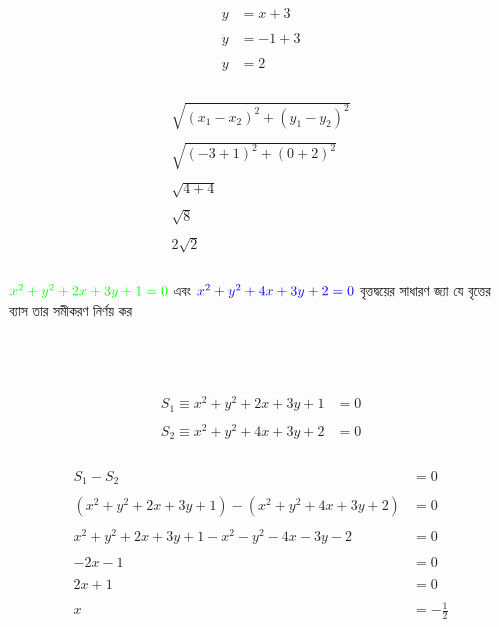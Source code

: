 \documentclass{article}
\begin{document}
\\
\begin{align*}
	y&=x+3\\
	\\
	y&=-1+3\\
	\\
	y&=2\\
\end{align*}
\\
\begin{align*}
	\sqrt{(x_1-x_2)^2+(y_1-y_2)^2}\\
	\\
	\sqrt{(-3+1)^2+(0+2)^2}\\
	\\
	\sqrt{4+4}\\
	\\
	\sqrt{8}\\
	\\
	2\sqrt{2}\\
\end{align*}
\\
$\textcolor{green}{x^2+y^2+2x+3y+1=0}$ এবং $\textcolor{blue}{x^2+y^2+4x+3y+2=0}$ বৃত্তদ্বয়ের সাধারণ জ্যা যে বৃত্তের ব্যাস তার সমীকরণ নির্ণয় কর \\
\\ 
\\
\\
\begin{align*}
	S_1\equiv x^2+y^2+2x+3y+1&=0\\
	\\
	S_2\equiv x^2+y^2+4x+3y+2&=0\\
\end{align*}
\\ 
\begin{align*}
S_1-S_2&=0\\
\\
(x^2+y^2+2x+3y+1) - (x^2+y^2+4x+3y+2)& =0\\
\\
x^2+y^2+2x+3y+1-x^2-y^2-4x-3y-2&=0\\
\\
-2x-1&=0\\
\\
2x+1&=0\\
\\
x&=-\frac{1}{2}
\end{align*}
\end{document}
